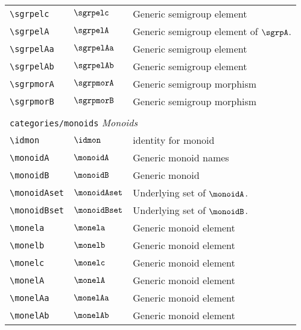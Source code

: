 \begin{longtable}{lll}
 {\color[rgb]{0.5,0.5,0.5}\texttt{\textbackslash sgrpelc}} & $\sgrpelc$ &  Generic semigroup element\\ 
 {\color[rgb]{0.5,0.5,0.5}\texttt{\textbackslash sgrpelA}} & $\sgrpelA$ &  Generic semigroup element of $\sgrpA$.\\ 
 {\color[rgb]{0.5,0.5,0.5}\texttt{\textbackslash sgrpelAa}} & $\sgrpelAa$ &  Generic semigroup element\\ 
 {\color[rgb]{0.5,0.5,0.5}\texttt{\textbackslash sgrpelAb}} & $\sgrpelAb$ &  Generic semigroup element\\ 
 {\color[rgb]{0.5,0.5,0.5}\texttt{\textbackslash sgrpmorA}} & $\sgrpmorA$ &  Generic semigroup morphism\\ 
 {\color[rgb]{0.5,0.5,0.5}\texttt{\textbackslash sgrpmorB}} & $\sgrpmorB$ &  Generic semigroup morphism\\ 
  &  & \\ 
 \multicolumn{3}{l}{{\color[rgb]{0.5,0.5,0.5}\texttt{categories/monoids}} \emph{Monoids}}\\ 
 \hline
{\color[rgb]{0.5,0.5,0.5}\texttt{\textbackslash idmon}} & $\idmon$ &  identity for monoid\\ 
 {\color[rgb]{0.5,0.5,0.5}\texttt{\textbackslash monoidA}} & $\monoidA$ &  Generic monoid names\\ 
 {\color[rgb]{0.5,0.5,0.5}\texttt{\textbackslash monoidB}} & $\monoidB$ &  Generic monoid\\ 
 {\color[rgb]{0.5,0.5,0.5}\texttt{\textbackslash monoidAset}} & $\monoidAset$ &  Underlying set of $\monoidA$.\\ 
 {\color[rgb]{0.5,0.5,0.5}\texttt{\textbackslash monoidBset}} & $\monoidBset$ &  Underlying set of $\monoidB$.\\ 
 {\color[rgb]{0.5,0.5,0.5}\texttt{\textbackslash monela}} & $\monela$ &  Generic monoid element\\ 
 {\color[rgb]{0.5,0.5,0.5}\texttt{\textbackslash monelb}} & $\monelb$ &  Generic monoid element\\ 
 {\color[rgb]{0.5,0.5,0.5}\texttt{\textbackslash monelc}} & $\monelc$ &  Generic monoid element\\ 
 {\color[rgb]{0.5,0.5,0.5}\texttt{\textbackslash monelA}} & $\monelA$ &  Generic monoid element\\ 
 {\color[rgb]{0.5,0.5,0.5}\texttt{\textbackslash monelAa}} & $\monelAa$ &  Generic monoid element\\ 
 {\color[rgb]{0.5,0.5,0.5}\texttt{\textbackslash monelAb}} & $\monelAb$ &  Generic monoid element\\ 

\end{longtable}
